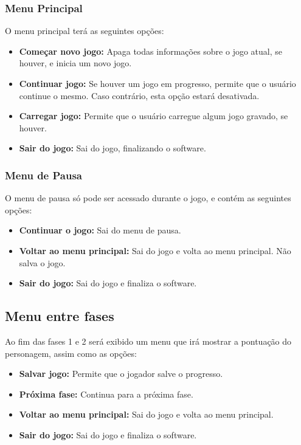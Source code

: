 \subsubsection{Menu Principal}

O menu principal terá as seguintes opções:
\begin{itemize}
 \item {\bf Começar novo jogo:} Apaga todas informações sobre o jogo atual,
se houver, e inicia um novo jogo.
 \item {\bf Continuar jogo:} Se houver um jogo em progresso, permite que
o usuário continue o mesmo. Caso contrário, esta opção estará desativada.
 \item {\bf Carregar jogo:} Permite que o usuário carregue algum jogo
gravado, se houver.
 \item {\bf Sair do jogo:} Sai do jogo, finalizando o software.
\end{itemize}

\subsubsection{Menu de Pausa}
O menu de pausa só pode ser acessado durante o jogo, e contém as seguintes
opções:
\begin{itemize}
 \item {\bf Continuar o jogo:} Sai do menu de pausa.
 \item {\bf Voltar ao menu principal:} Sai do jogo e volta ao menu 
principal. Não salva o jogo.
 \item {\bf Sair do jogo:} Sai do jogo e finaliza o software.
\end{itemize}

\subsection{Menu entre fases}
Ao fim das fases 1 e 2 será exibido um menu que irá mostrar a pontuação do
personagem, assim como as opções:
\begin{itemize}
 \item {\bf Salvar jogo:} Permite que o jogador salve o progresso.
 \item {\bf Próxima fase:} Continua para a próxima fase.
 \item {\bf Voltar ao menu principal:} Sai do jogo e volta ao menu principal.
 \item {\bf Sair do jogo:} Sai do jogo e finaliza o software.
\end{itemize}
